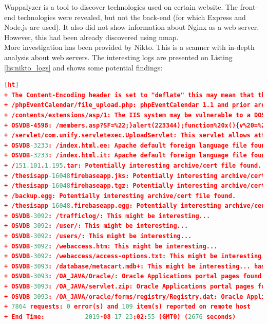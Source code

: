 \documentclass{article} %
\begin{document}
\newline
Wappalyzer is a tool to discover technologies used on certain website. The front-end technologies were revealed, but not the back-end (for which Express and Node.js are used). It also did not show information about Nginx as a web server. However, this had been already discovered using nmap.\\
\newline
More investigation has been provided by Nikto. This is a scanner with in-depth analysis about web servers. The interesting logs are presented on Listing \ref{lis:nikto_logs} and shows some potential findings:
\begin{lstlisting}[language=json,firstnumber=1,label={lis:nikto_logs},caption={Nikto logs.}][ht]
+ The Content-Encoding header is set to "deflate" this may mean that the server is vulnerable to the BREACH attack.
+ /phpEventCalendar/file_upload.php: phpEventCalendar 1.1 and prior are vulnerable to file upload bug.
+ /contents/extensions/asp/1: The IIS system may be vulnerable to a DOS, see https://docs.microsoft.com/en-us/security-updates/securitybulletins/2002/MS02-018 for details.
+ OSVDB-4598: /members.asp?SF=%22;}alert(223344);function%20x(){v%20=%22: Web Wiz Forums ver. 7.01 and below is vulnerable to Cross Site Scripting (XSS)\index{Cross-Site Scripting (XSS)}. http://www.cert.org/advisories/CA-2000-02.html.
+ /servlet/com.unify.servletexec.UploadServlet: This servlet allows attackers to upload files to the server.
+ OSVDB-3233: /index.html.ee: Apache default foreign language file found. All default files should be removed from the web server\index{Web Server} as they may give an attacker additional system information.
+ OSVDB-3233: /index.html.it: Apache default foreign language file found. All default files should be removed from the web server\index{Web Server} as they may give an attacker additional system information.
+ /151.101.1.195.tar: Potentially interesting archive/cert file found.
+ /thesisapp-16048firebaseapp.jks: Potentially interesting archive/cert file found.
+ /thesisapp-16048firebaseapp.tgz: Potentially interesting archive/cert file found.
+ /backup.egg: Potentially interesting archive/cert file found.
+ /thesisapp-16048.firebaseapp.egg: Potentially interesting archive/cert file found.
+ OSVDB-3092: /trafficlog/: This might be interesting...
+ OSVDB-3092: /user/: This might be interesting...
+ OSVDB-3092: /users/: This might be interesting...
+ OSVDB-3092: /webaccess.htm: This might be interesting...
+ OSVDB-3092: /webaccess/access-options.txt: This might be interesting...
+ OSVDB-3093: /database/metacart.mdb+: This might be interesting... has been seen in web logs from an unknown scanner.
+ OSVDB-3093: /OA_JAVA/Oracle/: Oracle Applications portal pages found.
+ OSVDB-3093: /OA_JAVA/servlet.zip: Oracle Applications portal pages found.
+ OSVDB-3093: /OA_JAVA/oracle/forms/registry/Registry.dat: Oracle Applications portal pages found.
+ 7864 requests: 0 error(s) and 109 item(s) reported on remote host
+ End Time:           2019-08-17 23:02:55 (GMT0) (2676 seconds)
\end{lstlisting}
\end{document}
